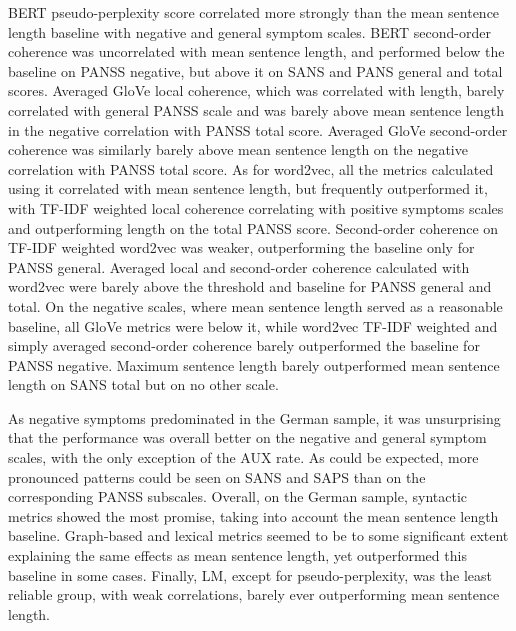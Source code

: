 BERT pseudo-perplexity score correlated more strongly than the mean sentence length baseline with negative and general symptom scales. BERT second-order coherence was uncorrelated with mean sentence length, and performed below the baseline on PANSS negative, but above it on SANS and PANS general and total scores. Averaged GloVe local coherence, which was correlated with length, barely correlated with general PANSS scale and was barely above mean sentence length in the negative correlation with PANSS total score. Averaged GloVe second-order coherence was similarly barely above mean sentence length on the negative correlation with PANSS total score. As for word2vec, all the metrics calculated using it correlated with mean sentence length, but frequently outperformed it, with TF-IDF weighted local coherence correlating with positive symptoms scales and outperforming length on the total PANSS score. Second-order coherence on TF-IDF weighted word2vec was weaker, outperforming the baseline only for PANSS general. Averaged local and second-order coherence calculated with word2vec were barely above the threshold and baseline for PANSS general and total. On the negative scales, where mean sentence length served as a reasonable baseline, all GloVe metrics were below it, while word2vec TF-IDF weighted and simply averaged second-order coherence barely outperformed the baseline for PANSS negative. Maximum sentence length barely outperformed mean sentence length on SANS total but on no other scale.

As negative symptoms predominated in the German sample, it was unsurprising that the performance was overall better on the negative and general symptom scales, with the only exception of the AUX rate. As could be expected, more pronounced patterns could be seen on SANS and SAPS than on the corresponding PANSS subscales. Overall, on the German sample, syntactic metrics showed the most promise, taking into account the mean sentence length baseline. Graph-based and lexical metrics seemed to be to some significant extent explaining the same effects as mean sentence length, yet outperformed this baseline in some cases. Finally, LM, except for pseudo-perplexity, was the least reliable group, with weak correlations, barely ever outperforming mean sentence length. 

